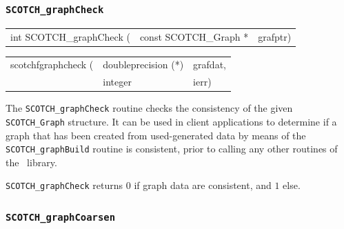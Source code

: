 \subsubsection{{\tt SCOTCH\_graphCheck}}

\begin{itemize}
\progsyn

{\tt\begin{tabular}{l@{}ll}
int SCOTCH\_graphCheck ( & const SCOTCH\_Graph * & grafptr)
\end{tabular}}

{\tt\begin{tabular}{l@{}ll}
scotchfgraphcheck ( & doubleprecision (*) & grafdat, \\
                    & integer             & ierr)
\end{tabular}}

\progdes

The {\tt SCOTCH\_graphCheck} routine checks the consistency of the
given {\tt SCOTCH\_\lbt Graph} structure. It can be used in client
applications to determine if a graph that has been created from
used-generated data by means of the {\tt SCOTCH\_\lbt graph\lbt Build}
routine is consistent, prior to calling any other routines of the
\libscotch\ library.

\progret

{\tt SCOTCH\_graphCheck} returns $0$ if graph data are consistent, and
$1$ else.

\end{itemize}

\subsubsection{{\tt SCOTCH\_graphCoarsen}}

